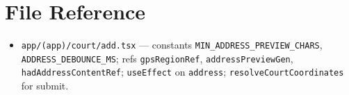 \documentclass[11pt,a4paper]{article}
\begin{document}
\section{File Reference}

\begin{itemize}[noitemsep]
    \item \texttt{app/(app)/court/add.tsx} --- constants \texttt{MIN\_ADDRESS\_PREVIEW\_CHARS}, \texttt{ADDRESS\_DEBOUNCE\_MS}; refs \texttt{gpsRegionRef}, \texttt{addressPreviewGen}, \texttt{hadAddressContentRef}; \texttt{useEffect} on \texttt{address}; \texttt{resolveCourtCoordinates} for submit.
\end{itemize}
\end{document}
